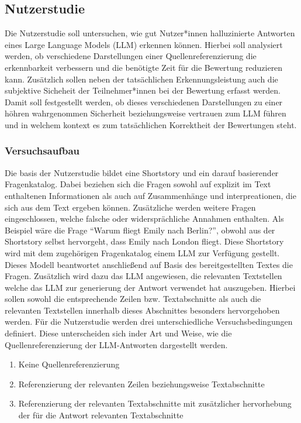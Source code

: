 \subsection{Nutzerstudie}
Die Nutzerstudie soll untersuchen, wie gut Nutzer*innen halluzinierte Antworten eines Large Language Models (LLM) erkennen können. Hierbei soll analysiert werden, ob verschiedene Darstellungen einer Quellenreferenzierung die erkennbarkeit verbessern und die benötigte Zeit für die Bewertung reduzieren kann. \newline \noindent
Zusätzlich sollen neben der tatsächlichen Erkennungsleistung auch die subjektive Sicheheit der Teilnehmer*innen bei der Bewertung erfasst werden. Damit soll festgestellt werden, ob dieses verschiedenen Darstellungen zu einer höhren wahrgenommen Sicherheit beziehungsweise vertrauen zum LLM führen und in welchem kontext es zum tatsächlichen Korrektheit der Bewertungen steht.


\subsubsection{Versuchsaufbau}
Die basis der Nutzerstudie bildet eine Shortstory und ein darauf basierender Fragenkatalog. Dabei beziehen sich die Fragen sowohl auf explizit im Text enthaltenen Informationen als auch auf Zusammenhänge und interpreationen, die sich aus dem Text ergeben können. Zusätzliche werden weitere Fragen eingeschlossen, welche falsche oder widersprächliche Annahmen enthalten. Als Beispiel wäre die Frage \enquote{Warum fliegt Emily nach Berlin?}, obwohl aus der Shortstory selbst hervorgeht, dass Emily nach London fliegt. \newline \noindent
Diese Shortstory wird mit dem zugehörigen Fragenkatalog einem LLM zur Verfügung gestellt. Dieses Modell beantwortet anschließend auf Basis des bereitgestellten Textes die Fragen. Zusätzlich wird dazu das LLM angewiesen, die relevanten Textstellen welche das LLM zur generierung der Antwort verwendet hat auszugeben. Hierbei sollen sowohl die entsprechende Zeilen bzw. Textabschnitte als auch die relevanten Textstellen innerhalb dieses Abschnittes besonders hervorgehoben werden.
Für die Nutzerstudie werden drei unterschiedliche Versuchsbedingungen definiert. Diese unterscheiden sich inder Art und Weise, wie die Quellenreferenzierung der LLM-Antworten dargestellt werden.
\begin{enumerate}
    \item Keine Quellenreferenzierung
    \item Referenzierung der relevanten Zeilen beziehungsweise Textabschnitte
    \item Referenzierung der relevanten Textabschnitte mit zusätzlicher hervorhebung der für die Antwort relevanten Textabschnitte
\end{enumerate} \noindent


